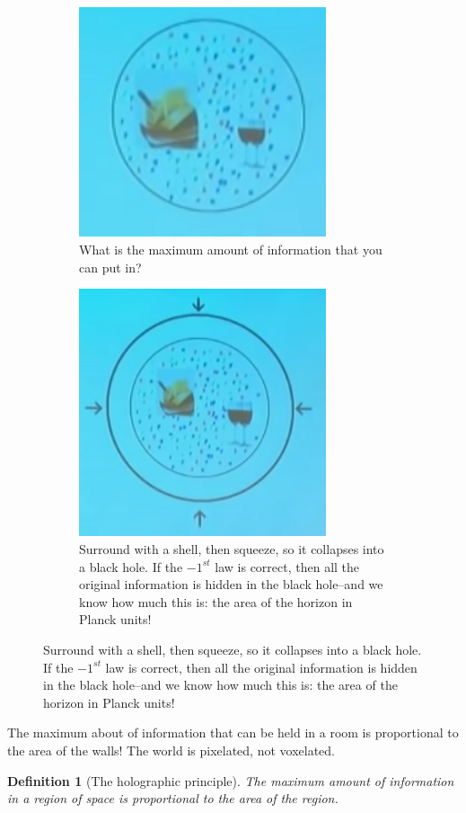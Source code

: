 \documentclass[]{article}
\newtheorem{defn}[thm]{Definition}
\begin{document}
\begin{figure}[H]
	\begin{center}
		\caption[Put some information in a box]{Put some information in a box. It could be alphabet soup, wine, cheese,...}
		\begin{subfigure}[t]{0.45\textwidth}
			\caption{	What is the maximum amount of information that you can put in?}
			\includegraphics[width=0.8\textwidth]{wh-information-in-box}
		\end{subfigure}
		\begin{subfigure}[t]{0.45\textwidth}
			\caption{Surround with a shell, then squeeze, so it collapses into a black hole. If the $-1^{st}$ law is correct, then all the original information is hidden in the black hole--and we know how much this is: the area of the horizon in Planck units!}
			\includegraphics[width=0.8\textwidth]{wh-surround-region}
		\end{subfigure}
	\end{center}
\end{figure}
The maximum about of information that can be held in a room is proportional to the area of the walls! The world is pixelated, not voxelated.
\begin{defn}[The holographic principle]
	The maximum amount of information in a region of space is proportional to the area of the region.
\end{defn}
\end{document}
